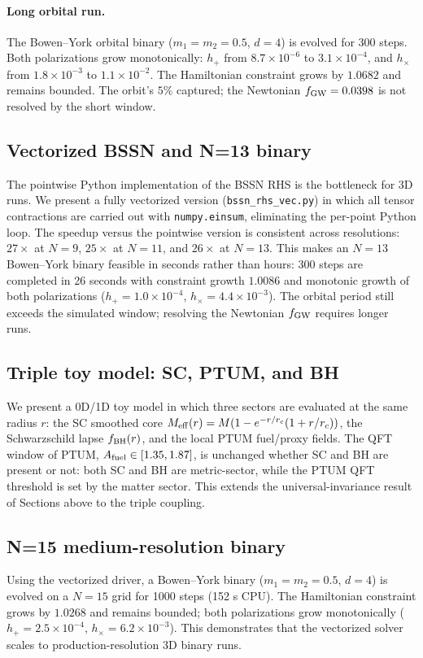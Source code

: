 \paragraph{Long orbital run.}
The Bowen--York orbital binary ($m_1 = m_2 = 0.5$, $d = 4$) is
evolved for 300 steps. Both polarizations grow monotonically:
$h_+$ from $8.7\times 10^{-6}$ to $3.1\times 10^{-4}$, and
$h_\times$ from $1.8\times 10^{-3}$ to $1.1\times 10^{-2}$. The
Hamiltonian constraint grows by $1.0682$ and remains bounded. The
orbit's $5\%$ captured; the Newtonian $f_{\rm GW} = 0.0398$ is
not resolved by the short window.

\subsection{Vectorized BSSN and N=13 binary}
The pointwise Python implementation of the BSSN RHS is the
bottleneck for 3D runs. We present a fully vectorized version
(\texttt{bssn\_rhs\_vec.py}) in which all tensor contractions are
carried out with \texttt{numpy.einsum}, eliminating the per-point
Python loop. The speedup versus the pointwise version is
consistent across resolutions:
$27\times$ at $N=9$, $25\times$ at $N=11$, and $26\times$ at
$N=13$. This makes an $N=13$ Bowen--York binary feasible in
seconds rather than hours: 300 steps are completed in 26 seconds
with constraint growth $1.0086$ and monotonic growth of both
polarizations ($h_+ = 1.0\times 10^{-4}$, $h_\times = 4.4\times
10^{-3}$). The orbital period still exceeds the simulated window;
resolving the Newtonian $f_{\rm GW}$ requires longer runs.

\subsection{Triple toy model: SC, PTUM, and BH}
We present a 0D/1D toy model in which three sectors are evaluated
at the same radius $r$: the SC smoothed core $M_{\rm eff}(r) =
M(1 - e^{-r/r_c}(1 + r/r_c))$, the Schwarzschild lapse
$f_{\rm BH}(r)$, and the local PTUM fuel/proxy fields. The QFT
window of PTUM, $A_{\rm fuel} \in [1.35, 1.87]$, is unchanged
whether SC and BH are present or not: both SC and BH are
metric-sector, while the PTUM QFT threshold is set by the matter
sector. This extends the universal-invariance result of
Sections above to the triple coupling.

\subsection{N=15 medium-resolution binary}
Using the vectorized driver, a Bowen--York binary ($m_1 = m_2 =
0.5$, $d = 4$) is evolved on a $N = 15$ grid for 1000 steps
(152 s CPU). The Hamiltonian constraint grows by $1.0268$ and
remains bounded; both polarizations grow monotonically
($h_+ = 2.5\times 10^{-4}$, $h_\times = 6.2\times 10^{-3}$).
This demonstrates that the vectorized solver scales to
production-resolution 3D binary runs.

